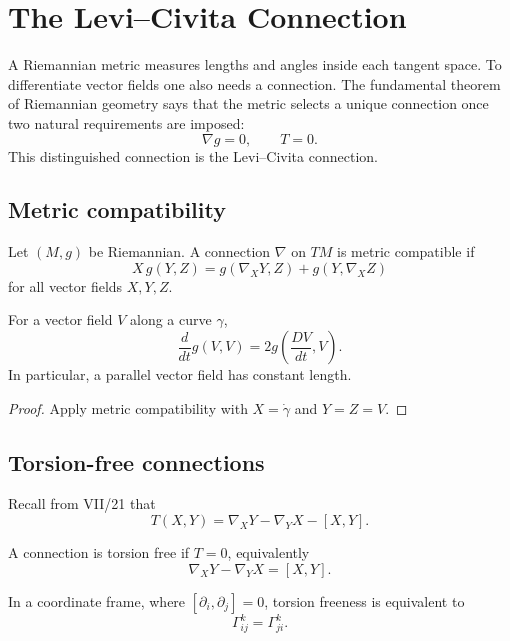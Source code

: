 \chapter{The Levi--Civita Connection}
\label{ch:vii22-levi-civita}

A Riemannian metric measures lengths and angles inside each tangent space.  To
differentiate vector fields one also needs a connection.  The fundamental theorem
of Riemannian geometry says that the metric selects a unique connection once two
natural requirements are imposed:
\[
\boxed{\nabla g=0,\qquad T=0.}
\]
This distinguished connection is the Levi--Civita connection.

\section{Metric compatibility}

\begin{definition}\label{def:vii22-metric-compatible}
Let \((M,g)\) be Riemannian.  A connection \(\nabla\) on \(TM\) is metric compatible
if
\[
X\,g(Y,Z)
=
g(\nabla_XY,Z)+g(Y,\nabla_XZ)
\]
for all vector fields \(X,Y,Z\).
\end{definition}

\begin{proposition}\label{prop:vii22-norm-derivative}
For a vector field \(V\) along a curve \(\gamma\),
\[
\frac{d}{dt}g(V,V)
=
2g\!\left(\frac{DV}{dt},V\right).
\]
In particular, a parallel vector field has constant length.
\end{proposition}

\begin{proof}
Apply metric compatibility with \(X=\dot\gamma\) and \(Y=Z=V\).
\end{proof}

\section{Torsion-free connections}

Recall from VII/21 that
\[
T(X,Y)=\nabla_XY-\nabla_YX-[X,Y].
\]

\begin{definition}\label{def:vii22-torsion-free}
A connection is torsion free if \(T=0\), equivalently
\[
\nabla_XY-\nabla_YX=[X,Y].
\]
\end{definition}

In a coordinate frame, where \([\partial_i,\partial_j]=0\), torsion freeness is
equivalent to
\[
\Gamma^k_{ij}=\Gamma^k_{ji}.
\]

